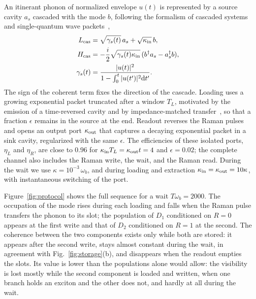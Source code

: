 \documentclass[aps,pra,preprint,groupedaddress,amsmath,amssymb,floatfix]{revtex4-2}
\begin{document}
An itinerant phonon of normalized envelope $u(t)$ is represented by a source cavity $a_s$ cascaded with the mode $b$, following the formalism of cascaded systems and single-quantum wave packets~\cite{gardiner1993,carmichael1993,gough2012},
\begin{align}
L_{\rm cas}&=\sqrt{\gamma_s(t)}\,a_s+\sqrt{\kappa_{\rm in}}\,b,\nonumber\\
H_{\rm cas}&=-\frac i2\sqrt{\gamma_s(t)\kappa_{\rm in}}\,(b^\dagger a_s-a_s^\dagger b),\nonumber\\
\gamma_s(t)&=\frac{|u(t)|^2}{1-\int_0^t|u(t')|^2\mathrm dt'}.\label{eq:cascade}
\end{align}
The sign of the coherent term fixes the direction of the cascade. Loading uses a growing exponential packet truncated after a window $T_L$, motivated by the emission of a time-reversed cavity and by impedance-matched transfer~\cite{cirac1997}, so that a fraction $\epsilon$ remains in the source at the end. Readout reverses the Raman pulses and opens an output port $\kappa_{\rm out}$ that captures a decaying exponential packet in a sink cavity, regularized with the same $\epsilon$. The efficiencies of these isolated ports, $\eta_L$ and $\eta_R$, are close to $0.96$ for $\kappa_{\rm in}T_L=\kappa_{\rm out}t=4$ and $\epsilon=0.02$; the complete channel also includes the Raman write, the wait, and the Raman read. During the wait we use $\kappa=10^{-3}\,\omega_b$, and during loading and extraction $\kappa_{\rm in}=\kappa_{\rm out}=10\kappa$, with instantaneous switching of the port.

Figure~\ref{fig:protocol} shows the full sequence for a wait $T\omega_b=2000$. The occupation of the mode rises during each loading and falls when the Raman pulse transfers the phonon to its slot; the population of $D_1$ conditioned on $R=0$ appears at the first write and that of $D_2$ conditioned on $R=1$ at the second. The coherence between the two components exists only while both are stored: it appears after the second write, stays almost constant during the wait, in agreement with Fig.~\ref{fig:storage}(b), and disappears when the readout empties the slots. Its value is lower than the populations alone would allow: the visibility is lost mostly while the second component is loaded and written, when one branch holds an exciton and the other does not, and hardly at all during the wait.
\end{document}
